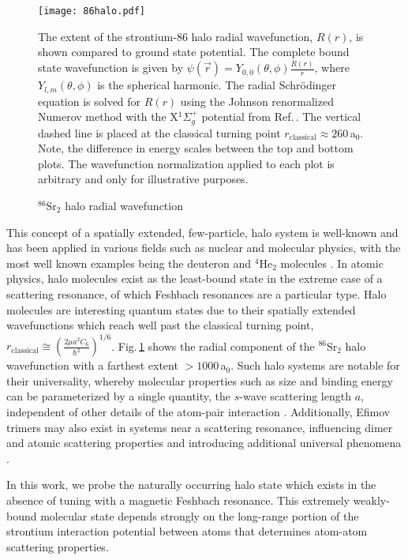	\begin{figure}
		\centerline{
		\texttt{[image: 86halo.pdf]}}
		\caption{$^{86}$Sr$_2$ halo radial wavefunction}{The extent of the strontium-86 halo radial wavefunction, $R(r)$, is shown compared to ground state potential. The complete bound state wavefunction is given by $\psi(\vec{r})=Y_{0,0}(\theta,\phi)\frac{R(r)}{r}$, where $Y_{l,m}(\theta,\phi)$ is the spherical harmonic. The radial Schr\"{o}dinger equation is solved for $R(r)$ using the Johnson renormalized Numerov method \cite{Gibson2016, Johnson1978} with the X$^1\Sigma_g^+$ potential from Ref.\,\cite{Stein2010}. The vertical dashed line is placed at the classical turning point $r_\text{classical} \approx 260$\,a$_0$. Note, the difference in energy scales between the top and bottom plots. The wavefunction normalization applied to each plot is arbitrary and only for illustrative purposes.}
		\label{fig:86halo}
	\end{figure} 
This concept of a spatially extended, few-particle, halo system is well-known and has been applied in various fields such as nuclear and molecular physics, with the most well known examples being the deuteron and $^4$He$_2$ molecules \cite{lmk93,sto94,Kohler2006}.
In atomic physics, halo molecules exist as the least-bound state in the extreme case of a scattering resonance, of which Feshbach resonances are a particular type.
Halo molecules are interesting quantum states due to their spatially extended wavefunctions which reach well past the classical turning point, $r_\text{classical} \cong \left( \frac{2 \mu a^2 C_6}{\hbar^2} \right)^{1/6}$.
Fig.\,\ref{fig:86halo} shows the radial component of the $^{86}$Sr$_2$ halo wavefunction with a farthest extent $>\!1000$\,a$_0$.
Such halo systems are notable for their universality, whereby molecular properties such as size and binding energy can be parameterized by a single quantity, the $s$-wave scattering length $a$, independent of other details of the atom-pair interaction \cite{Kohler2006,bha06}. 
Additionally, Efimov trimers may also exist in systems near a scattering resonance, influencing dimer and atomic scattering properties and introducing additional universal phenomena \cite{bha07,nen17}.

In this work, we probe the naturally occurring halo state which exists in the absence of tuning with a magnetic Feshbach resonance. 
This extremely weakly-bound molecular state depends strongly on the long-range portion of the strontium interaction potential between atoms that determines atom-atom scattering properties.

